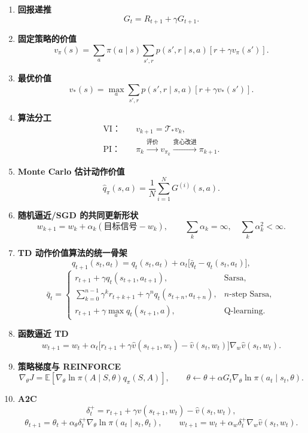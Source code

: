 \documentclass[11pt,a4paper,fontset=fandol]{ctexart}
\newcommand{\E}{\mathbb{E}}
\newcommand{\vpi}{v_{\pi}}
\newcommand{\vstar}{v_*}
\newcommand{\Tstar}{\mathcal{T}_*}
\begin{document}
\begin{enumerate}
  \item \textbf{回报递推}
  \[
  G_t=R_{t+1}+\gamma G_{t+1}.
  \]

  \item \textbf{固定策略的价值}
  \[
  \vpi(s)
  =
  \sum_a\pi(a\mid s)
  \sum_{s',r}p(s',r\mid s,a)
  [r+\gamma\vpi(s')].
  \]

  \item \textbf{最优价值}
  \[
  \vstar(s)
  =
  \max_a
  \sum_{s',r}p(s',r\mid s,a)
  [r+\gamma\vstar(s')].
  \]

  \item \textbf{算法分工}
  \[
  \begin{aligned}
  \text{VI：}\quad&
  v_{k+1}=\Tstar v_k,\\
  \text{PI：}\quad&
  \pi_k\xrightarrow{\text{评价}}v_{\pi_k}
  \xrightarrow{\text{贪心改进}}\pi_{k+1}.
  \end{aligned}
  \]

  \item \textbf{Monte Carlo 估计动作价值}
  \[
  \hat q_{\pi}(s,a)
  =
  \frac{1}{N}\sum_{i=1}^{N}G^{(i)}(s,a).
  \]

  \item \textbf{随机逼近/SGD 的共同更新形状}
  \[
  w_{k+1}
  =
  w_k+\alpha_k(\text{目标信号}-w_k),
  \qquad
  \sum_k\alpha_k=\infty,\quad
  \sum_k\alpha_k^2<\infty.
  \]

  \item \textbf{TD 动作价值算法的统一骨架}
  \[
  q_{t+1}(s_t,a_t)
  =
  q_t(s_t,a_t)
  +\alpha_t\bigl[\bar q_t-q_t(s_t,a_t)\bigr],
  \]
  \[
  \bar q_t=
  \begin{cases}
  r_{t+1}+\gamma q_t(s_{t+1},a_{t+1}),
  & \text{Sarsa},\\
  \displaystyle
  \sum_{k=0}^{n-1}\gamma^k r_{t+k+1}
  +\gamma^nq_t(s_{t+n},a_{t+n}),
  & n\text{-step Sarsa},\\
  r_{t+1}+\gamma\max_a q_t(s_{t+1},a),
  & \text{Q-learning}.
  \end{cases}
  \]

  \item \textbf{函数逼近 TD}
  \[
  w_{t+1}=w_t+\alpha_t
  \bigl[r_{t+1}+\gamma\hat v(s_{t+1},w_t)-\hat v(s_t,w_t)\bigr]
  \nabla_w\hat v(s_t,w_t).
  \]

  \item \textbf{策略梯度与 REINFORCE}
  \[
  \nabla_\theta J
  =\E[\nabla_\theta\ln\pi(A\mid S,\theta)q_\pi(S,A)],
  \qquad
  \theta\leftarrow\theta+\alpha G_t
  \nabla_\theta\ln\pi(a_t\mid s_t,\theta).
  \]

  \item \textbf{A2C}
  \[
  \delta_t^+=r_{t+1}+\gamma\hat v(s_{t+1},w_t)-\hat v(s_t,w_t),
  \]
  \[
  \theta_{t+1}=\theta_t+\alpha_\theta\delta_t^+
  \nabla_\theta\ln\pi(a_t\mid s_t,\theta_t),
  \qquad
  w_{t+1}=w_t+\alpha_w\delta_t^+\nabla_w\hat v(s_t,w_t).
  \]
\end{enumerate}
\end{document}
